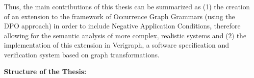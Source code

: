 
Thus, the main contributions of this thesis can be summarized as (1) the creation of an extension  to the framework of Occurrence Graph Grammars (using the DPO approach) in order to include Negative Application Conditions, therefore allowing for the semantic analysis of more complex, realistic systems and (2) the implementation of this extension in Verigraph, a software specification and verification system based on graph transformations.

\hfill \break
\textbf{Structure of the Thesis:}

